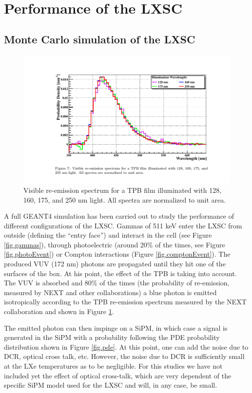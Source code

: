 \section{Performance of the LXSC}
\label{sec.mc}

\subsection{Monte Carlo simulation of the LXSC}

\begin{figure}[!bhtp]
	\centering
	\includegraphics[scale=0.9]{img/TPBSpectrum.pdf}
	
	\caption{\label{fig.tpb} Visible re-emission spectrum for a TPB film illuminated with 128, 160, 175, and 250 nm light. All spectra are normalized to unit area.}
\end{figure}


A full GEANT4 simulation has been carried out to study the performance of different configurations of the LXSC. Gammas of 511 keV enter the LXSC from outside (defining the ``entry face'') and interact in the cell (see Figure \ref{fig.gammas}), through photoelectric (around 20\% of the times, see Figure \ref{fig.photoEvent}) or Compton interactions (Figure \ref{fig.comptonEvent}). The produced VUV (172 nm) photons are propagated until they hit one of the surfaces of the box. At his point, the effect of the TPB is taking into account. The VUV is absorbed and 80\% of the times (the probability of re-emission, measured by NEXT and other collaborations) a blue photon is emitted isotropically according to the TPB re-emission spectrum measured by the NEXT collaboration and shown in Figure \ref{fig.tpb}.

The emitted photon can then impinge on a SiPM, in which case a signal is generated in the SiPM with a probability following the PDE probability distribution shown in Figure \ref{fig.pde}. At this point, one can add the noise due to DCR, optical cross talk, etc. However, the noise due to DCR is sufficiently small at the LXe temperatures as to be negligible. For this studies we have not included yet the effect of optical cross-talk, which are very dependent of the specific SiPM model used for the LXSC and will, in any case, be small.  


